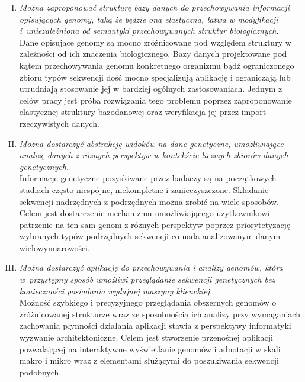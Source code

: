
\begin{enumerate}[I.]
	\item \textit{
		Można zaproponować strukturę bazy danych do przechowywania informacji opisujących genomy, taką że będzie ona elastyczna, łatwa w modyfikacji i~uniezależniona od semantyki przechowywanych struktur biologicznych.
		} \\
	\break
	Dane opisujące genomy są mocno zróżnicowane pod względem struktury w zależności od ich znaczenia biologicznego. Bazy danych projektowane pod kątem przechowywania genomu konkretnego organizmu bądź ograniczonego zbioru typów sekwencji dość mocno specjalizują aplikację i ograniczają lub utrudniają stosowanie jej w bardziej ogólnych zastosowaniach. Jednym z celów pracy jest próba rozwiązania tego problemu poprzez zaproponowanie elastycznej struktury bazodanowej oraz weryfikacja jej przez import rzeczywistych danych.\\
	
	\item \textit{
		Można dostarczyć abstrakcję widoków na dane genetyczne, umożliwiające analizę danych z różnych perspektyw w kontekście licznych zbiorów
		danych genetycznych.
		} \\
	\break
	Informacje genetyczne pozyskiwane przez badaczy są na początkowych stadiach często niespójne, niekompletne i zanieczyszczone. Składanie sekwencji nadrzędnych z podrzędnych można zrobić na wiele sposobów. Celem jest dostarczenie mechanizmu umożliwiającego użytkownikowi patrzenie na ten sam genom z różnych perspektyw poprzez priorytetyzację wybranych typów podrzędnych sekwencji co nada analizowanym danym wielowymiarowości.\\
	
	\item \textit{
		Można dostarczyć aplikację do przechowywania i analizy genomów, która w~przystępny sposób umożliwi przeglądanie sekwencji genetycznych bez konieczności posiadania wydajnej maszyny klienckiej. 
		} \\
		\break
	Możność szybkiego i precyzyjnego przeglądania obszernych genomów o zróżnicowanej strukturze wraz ze sposobnością ich analizy przy wymaganiach zachowania płynności działania aplikacji stawia z perspektywy informatyki wyzwanie architektoniczne. Celem jest stworzenie przenośnej aplikacji pozwalającej na interaktywne wyświetlanie genomów i adnotacji w skali makro i mikro wraz z elementami służącymi do poszukiwania sekwencji podobnych.
	
\end{enumerate}

